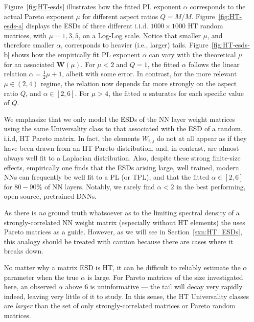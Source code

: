 Figure~\ref{fig:HT-esds} illustrates how the fitted PL exponent $\alpha$ corresponds to the actual Pareto exponent $\mu$ 
for different aspect ratios $Q=M/M$.
Figure~\ref{fig:HT-esds-a} displays the ESDs of three different i.i.d. $1000\times1000$ HT random matrices, with $\mu=1,3,5$, on a Log-Log scale.  
Notice that smaller $\mu$, and therefore smaller $\alpha$, corresponds to heavier (i.e., larger) tails.
Figure~\ref{fig:HT-esds-b} shows how the empirically fit PL exponent $\alpha$ can vary with the theoretical $\mu$ for an associated $\mathbf{W}(\mu)$.
For $\mu<2$ and $Q=1$, the fitted $\alpha$ follows the linear relation $\alpha=\frac{1}{2}\mu+1$,
albeit with some error.
In contrast, for the more relevant $\mu \in (2,4)$ regime, the relation now depends far more 
strongly on the aspect ratio $Q$, and $\alpha\in[2,6]$.
For $\mu>4$, the fitted $\alpha$ saturates for each specific value of $Q$.

We emphasize that we only model the ESDs of the NN layer weight matrices using the
same Universality class to that associated with the ESD of a random, i.i.d, HT Pareto matrix.
In fact, the elements $W_{i,j}$ do not at all appear as if they have been
drawn from an HT Pareto distribution, and, in contrast, are almost always well fit to a Laplacian distribution.
Also, despite these strong finite-size effects, empirically one finds that the ESDs arising large, well trained,
modern NNs can frequently be well fit to a PL (or TPL), and that the fitted $\alpha\in [2,6]$ for $80-90\%$
of NN layers.  Notably, we rarely find $\alpha<2$ in the best performing, open source, pretrained DNNs.

As there is \emph{no} ground truth whatsoever as to the limiting spectral density of a strongly-correlated NN weight matrix
(especially without HT elements)
the \HTSR \Phenomenology uses Pareto matrices as a guide. 
However, as we will see in Section~\ref{sxn:HT_ESDs}, this analogy should be treated with caution because there are 
cases where it breaks down.

No matter why a matrix ESD is HT, it can be difficult to reliably estimate the $\alpha$ parameter when
the true $\alpha$ is large. For Pareto matrices of the size investigated here, 
an observed $\alpha$ above $6$ is uninformative --- the tail will decay very rapidly indeed,
leaving very little of it to study.
In this sense, the HT Universality classes are \emph{larger} than the set of only strongly-correlated 
matrices or Pareto random matrices.



